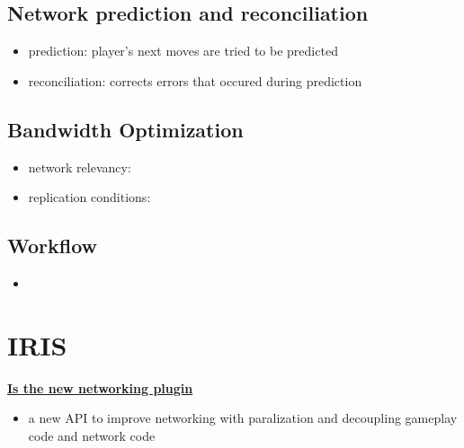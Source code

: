         
        \subsection{Network prediction and reconciliation}
        \begin{itemize}
            \item prediction: player's next moves are tried to be predicted
            \item reconciliation: corrects errors that occured during prediction
        \end{itemize}
        
        \subsection{Bandwidth Optimization}
        \begin{itemize}
            \item network relevancy: 
            \item replication conditions: 
        \end{itemize}
        
        
        \subsection{Workflow}
            \begin{itemize}
                \item 
            \end{itemize}


    \section{IRIS}
        \textbf{\uline{Is the new networking plugin}}
        \begin{itemize}
            \item a new API to improve networking with paralization and decoupling gameplay code and network code
        \end{itemize}

